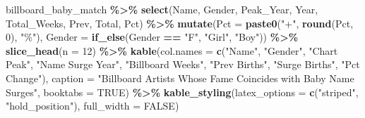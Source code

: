 \documentclass[
]{article}
\newenvironment{Shaded}{\begin{snugshade}}{\end{snugshade}}
\newcommand{\AttributeTok}[1]{\textcolor[rgb]{0.13,0.29,0.53}{#1}}
\newcommand{\ConstantTok}[1]{\textcolor[rgb]{0.56,0.35,0.01}{#1}}
\newcommand{\DecValTok}[1]{\textcolor[rgb]{0.00,0.00,0.81}{#1}}
\newcommand{\FunctionTok}[1]{\textcolor[rgb]{0.13,0.29,0.53}{\textbf{#1}}}
\newcommand{\NormalTok}[1]{#1}
\newcommand{\SpecialCharTok}[1]{\textcolor[rgb]{0.81,0.36,0.00}{\textbf{#1}}}
\newcommand{\StringTok}[1]{\textcolor[rgb]{0.31,0.60,0.02}{#1}}
\begin{document}
\begin{Shaded}
\begin{Highlighting}[]
\NormalTok{billboard\_baby\_match }\SpecialCharTok{\%\textgreater{}\%}
    \FunctionTok{select}\NormalTok{(Name, Gender, Peak\_Year, Year, Total\_Weeks, Prev, Total, Pct) }\SpecialCharTok{\%\textgreater{}\%}
    \FunctionTok{mutate}\NormalTok{(}\AttributeTok{Pct =} \FunctionTok{paste0}\NormalTok{(}\StringTok{"+"}\NormalTok{, }\FunctionTok{round}\NormalTok{(Pct, }\DecValTok{0}\NormalTok{), }\StringTok{"\%"}\NormalTok{),}
           \AttributeTok{Gender =} \FunctionTok{if\_else}\NormalTok{(Gender }\SpecialCharTok{==} \StringTok{"F"}\NormalTok{, }\StringTok{"Girl"}\NormalTok{, }\StringTok{"Boy"}\NormalTok{)) }\SpecialCharTok{\%\textgreater{}\%}
    \FunctionTok{slice\_head}\NormalTok{(}\AttributeTok{n =} \DecValTok{12}\NormalTok{) }\SpecialCharTok{\%\textgreater{}\%}
    \FunctionTok{kable}\NormalTok{(}\AttributeTok{col.names =} \FunctionTok{c}\NormalTok{(}\StringTok{"Name"}\NormalTok{, }\StringTok{"Gender"}\NormalTok{, }\StringTok{"Chart Peak"}\NormalTok{, }\StringTok{"Name Surge Year"}\NormalTok{,}
                         \StringTok{"Billboard Weeks"}\NormalTok{, }\StringTok{"Prev Births"}\NormalTok{, }\StringTok{"Surge Births"}\NormalTok{, }\StringTok{"Pct Change"}\NormalTok{),}
          \AttributeTok{caption =} \StringTok{"Billboard Artists Whose Fame Coincides with Baby Name Surges"}\NormalTok{,}
          \AttributeTok{booktabs =} \ConstantTok{TRUE}\NormalTok{) }\SpecialCharTok{\%\textgreater{}\%}
    \FunctionTok{kable\_styling}\NormalTok{(}\AttributeTok{latex\_options =} \FunctionTok{c}\NormalTok{(}\StringTok{"striped"}\NormalTok{, }\StringTok{"hold\_position"}\NormalTok{), }\AttributeTok{full\_width =} \ConstantTok{FALSE}\NormalTok{)}
\end{Highlighting}
\end{Shaded}
\end{document}
